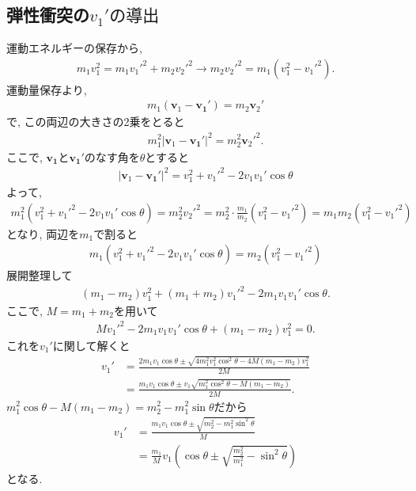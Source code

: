 \documentclass[a4paper,12pt]{jlreq}
\begin{document}
\subsection*{弾性衝突の$v_1'の導出$}
運動エネルギーの保存から, 
\begin{align}
  m_1v_1^2 = m_1 v_1'^2 + m_2 v_2'^2　\rightarrow　m_2 v_2'^2 = m_1(v_1^2 - v_1'^2).
\end{align}
運動量保存より, 
\begin{align}
  m_1(\bm{v}_1 - \bm{v_1'}) = m_2 \bm{v}_2'
\end{align}
で, この両辺の大きさの2乗をとると
\begin{align}
  m_1^2|\bm{v}_1 - \bm{v_1'}|^2 = m_2^2 \bm{v}_2'^2.
\end{align}
ここで, $\bm{v_1}$と$\bm{v_1'}$のなす角を$\theta$とすると
\begin{align}
  |\bm{v}_1 - \bm{v_1'}|^2 = v_1^2 + v_1'^2 -2v_1 v_1' \cos \theta
\end{align}
よって, 
\begin{align}
  m_1^2 (v_1^2 + v_1'^2 -2v_1 v_1' \cos \theta) = m_2^2 v_2'^2 = m_2^2 \cdot \frac{m_1}{m_2}(v_1^2 - v_1'^2) = m_1m_2(v_1^2 - v_1'^2)
\end{align}
となり, 両辺を$m_1$で割ると
\begin{align}
  m_1 (v_1^2 + v_1'^2 -2v_1v_1'\cos \theta) = m_2(v_1^2 - v_1'^2)
\end{align}
展開整理して
\begin{align}
  (m_1 - m_2)v_1^2 + (m_1 + m_2)v_1'^2 - 2m_1v_1v_1' \cos \theta.
\end{align}
ここで, $M = m_1 + m_2$を用いて
\begin{align}
  Mv_1'^2 - 2m_1 v_1 v_1'\cos \theta + (m_1 - m_2)v_1^2 = 0.
\end{align}
これを$v_1'$に関して解くと
\begin{align}
  v_1' &= \frac{2m_1 v_1 \cos \theta \pm \sqrt{4m_1^2 v_1^2 \cos^2\theta - 4M(m_1 - m_2)v_1^2}}{2M}\\
       &= \frac{m_1 v_1 \cos \theta \pm v_1\sqrt{m_1^2 \cos^2\theta - M(m_1 - m_2)}}{2M}.
\end{align}
$m_1^2\cos \theta - M(m_1 - m_2) = m_2^2 - m_1^2\sin \theta$だから
\begin{align}
  v_1' &= \frac{m_1 v_1 \cos \theta \pm \sqrt{m_2^2 - m_1^2 \sin^2 \theta}}{M}\\
      &= \frac{m_1}{M}v_1 \left(\cos \theta \pm \sqrt{\frac{m_2^2}{m_1^2} - \sin^2 \theta}\right)
\end{align}
となる. 
\end{document}
